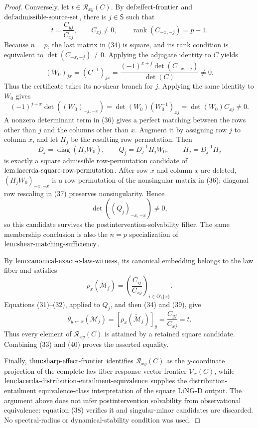 \documentclass{article}
\begin{document}
\begin{proof}
Conversely, let \(t\in\mathcal R_{xy}(C)\).  By
\(\textnormal{def:effect-frontier}\) and
\(\textnormal{def:admissible-source-set}\), there is \(j\in\mathsf S\) such that
\[
 t=\frac{C_{yj}}{C_{xj}},\qquad
 C_{xj}\ne0,\qquad
 \operatorname{rank}(C_{-x,-j})=p-1.                                      \tag{34}
\]
Because \(n=p\), the last matrix in (34) is square, and its rank condition is equivalent to
\(\det(C_{-x,-j})\ne0\).  Applying the adjugate identity to \(C\) yields
\[
 (W_0)_{jx}
 =(C^{-1})_{jx}
 =\frac{(-1)^{x+j}\det(C_{-x,-j})}{\det(C)}
 \ne0.                                                                      \tag{35}
\]
Thus the certificate takes its no-shear branch for \(j\).  Applying the same identity to \(W_0\) gives
\[
 (-1)^{j+x}\det((W_0)_{-j,-x})
 =\det(W_0)(W_0^{-1})_{xj}
 =\det(W_0)C_{xj}\ne0.                                                      \tag{36}
\]
A nonzero determinant term in (36) gives a perfect matching between the rows other than \(j\) and the columns other than \(x\).  Augment it by assigning row \(j\) to column \(x\), and let \(\Pi_j\) be the resulting row permutation.  Then
\[
 D_j=\operatorname{diag}(\Pi_jW_0),\qquad
 Q_j=D_j^{-1}\Pi_jW_0,\qquad
 H_j=D_j^{-1}\Pi_j                                                        \tag{37}
\]
is exactly a square admissible row-permutation candidate of
\(\textnormal{lem:lacerda-square-row-permutation}\).  After row \(x\) and column \(x\) are deleted, \((\Pi_jW_0)_{-x,-x}\) is a row permutation of the nonsingular matrix in (36); diagonal row rescaling in (37) preserves nonsingularity.  Hence
\[
 \det((Q_j)_{-x,-x})\ne0,                                                   \tag{38}
\]
so this candidate survives the postintervention-solvability filter.  The same membership conclusion is also the \(n=p\) specialization of
\(\textnormal{lem:shear-matching-sufficiency}\).

By \(\textnormal{lem:canonical-exact-c-law-witness}\), its canonical embedding belongs to the law fiber and satisfies
\[
 \rho_x(\widetilde{\mathcal M}_j)
 =\left(\frac{C_{ij}}{C_{xj}}\right)_{i\in\mathsf O\setminus\{x\}}.          \tag{39}
\]
Equations (31)--(32), applied to \(Q_j\), and then (34) and (39), give
\[
 \theta_{y\leftarrow x}(\mathcal M_j)
 =[\rho_x(\widetilde{\mathcal M}_j)]_y
 =\frac{C_{yj}}{C_{xj}}
 =t.                                                                        \tag{40}
\]
Thus every element of \(\mathcal R_{xy}(C)\) is attained by a retained square candidate.  Combining (33) and (40) proves the asserted equality.

Finally, \(\textnormal{thm:sharp-effect-frontier}\) identifies
\(\mathcal R_{xy}(C)\) as the \(y\)-coordinate projection of the complete law-fiber response-vector frontier \(\mathcal V_x(C)\), while
\(\textnormal{lem:lacerda-distribution-entailment-equivalence}\) supplies the distribution-entailment equivalence-class interpretation of the square LiNG-D output.  The argument above does not infer postintervention solvability from observational equivalence: equation (38) verifies it and singular-minor candidates are discarded.  No spectral-radius or dynamical-stability condition was used.
\end{proof}
\end{document}
